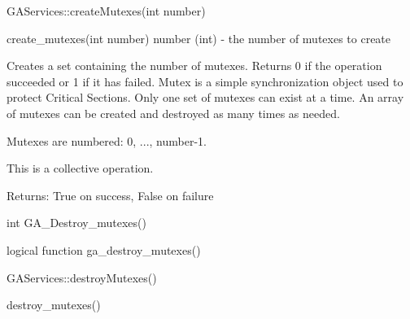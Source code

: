 \documentclass[12pt]{article}
\begin{document}
\begin{cxxapi}
\begin{cxxcode}
GAServices::createMutexes(int number)
\end{cxxcode}
\begin{funcargs}
\end{funcargs}
\end{cxxapi}

\begin{pyapi}
\begin{pycode}
create_mutexes(int number)  
   number (int) - the number of mutexes to create 
\end{pycode}
\end{pyapi}


\begin{desc}

Creates a set containing the number of mutexes. Returns 0 if the operation 
succeeded or 1 if it has failed. Mutex is a simple synchronization object 
used to protect Critical Sections. Only one set of mutexes can exist at a 
time. An array of mutexes can be created and destroyed as many times as needed.

Mutexes are numbered: 0, ..., number-1.

This is a collective operation.

Returns: 
True on success, False on failure 

\end{desc}


\begin{capi}
\begin{ccode}
int GA_Destroy_mutexes()
\end{ccode}
\end{capi}

\begin{fapi}
\begin{fcode}
logical function ga_destroy_mutexes()
\end{fcode}
\end{fapi}

\begin{cxxapi}
\begin{cxxcode}
GAServices::destroyMutexes()
\end{cxxcode}
\end{cxxapi}

\begin{pyapi}
\begin{pycode}
destroy_mutexes()  
\end{pycode}
\end{pyapi} 
\end{document}
